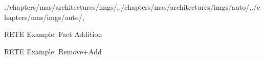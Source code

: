 \begin{graphicspathcontext}{{./chapters/mas/architectures/imgs/},{./chapters/mas/architectures/imgs/auto/},{./chapters/mas/imgs/auto/},\old}
\begin{frame}{{RETE Example:} Fact Addition}
	\centering{}
\end{frame}

\begin{frame}{{RETE Example:} Remove+Add}
	\centering{}
\end{frame}

\end{graphicspathcontext}

\endinput
